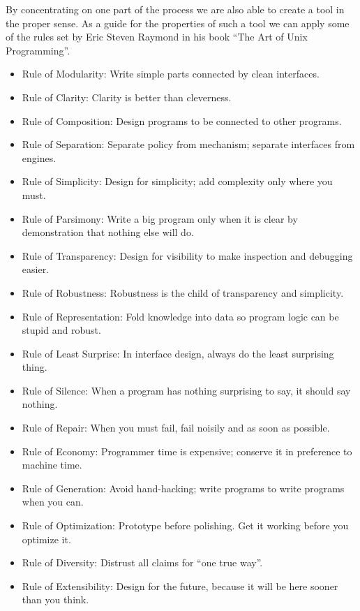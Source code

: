 \documentclass[thesis.tex]{subfiles}
\begin{document}
By concentrating on one part of the process we are also able to create a tool in
the proper sense. As a guide for the properties of such a tool we can apply
some of the rules set by Eric Steven Raymond in his book
``The Art of Unix Programming''.
\begin{citequote}{\cite[Chapter 1]{UXART}}
\begin{itemize}
	\item Rule of Modularity: Write simple parts connected by clean interfaces.
	\item Rule of Clarity: Clarity is better than cleverness.
	\item Rule of Composition: Design programs to be connected to other programs.
	\item Rule of Separation: Separate policy from mechanism; separate interfaces from engines.
	\item Rule of Simplicity: Design for simplicity; add complexity only where you must.
	\item Rule of Parsimony: Write a big program only when it is clear by demonstration that nothing else will do.
	\item Rule of Transparency: Design for visibility to make inspection and debugging easier.
	\item Rule of Robustness: Robustness is the child of transparency and simplicity.
	\item Rule of Representation: Fold knowledge into data so program logic can be stupid and robust.
	\item Rule of Least Surprise: In interface design, always do the least surprising thing.
	\item Rule of Silence: When a program has nothing surprising to say, it should say nothing.
	\item Rule of Repair: When you must fail, fail noisily and as soon as possible.
	\item Rule of Economy: Programmer time is expensive; conserve it in preference to machine time.
	\item Rule of Generation: Avoid hand-hacking; write programs to write programs when you can.
	\item Rule of Optimization: Prototype before polishing. Get it working before you optimize it.
	\item Rule of Diversity: Distrust all claims for ``one true way''.
	\item Rule of Extensibility: Design for the future, because it will be here sooner than you think.
\end{itemize}
\end{citequote}
\end{document}
